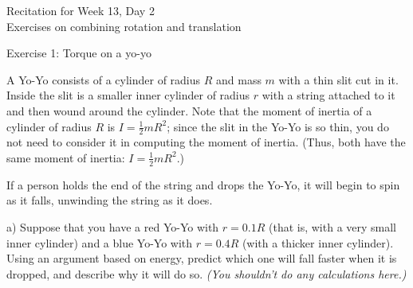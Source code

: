 \documentclass[12pt]{article}
\begin{document}
\Large

\begin{center}
\sc	Recitation for Week 13, Day 2 \\
\rm	Exercises on combining rotation and translation
	
	\large
	
	\medskip
	
	Exercise 1: Torque on a yo-yo
	
\end{center}

\normalsize

\begin{minipage}{0.6\textwidth}
A Yo-Yo consists of a cylinder of radius $R$ and mass $m$ with a thin slit cut in it. Inside the slit is a smaller inner cylinder of radius $r$ with a string attached to it and then wound around the cylinder. Note that the moment of inertia of a cylinder of radius $R$ is $I=\frac{1}{2}mR^2$; since the slit in the Yo-Yo is so thin, you do not need to consider it in computing the moment of inertia. (Thus, both have the same moment of inertia: $I=\frac{1}{2}mR^2$.)

If a person holds the end of the string and drops the Yo-Yo, it will begin to spin as it falls, unwinding the string as it does. 

\bigskip\bigskip

a) Suppose that you have a red Yo-Yo with $r=0.1 R$ (that is, with a very small inner cylinder) and a blue Yo-Yo with $r=0.4 R$ (with a thicker inner cylinder). Using an argument based on energy, predict which one will fall faster when it is dropped, and describe why it will do so. \textit{(You shouldn't do any calculations here.)}
\end{minipage}
\end{document}
